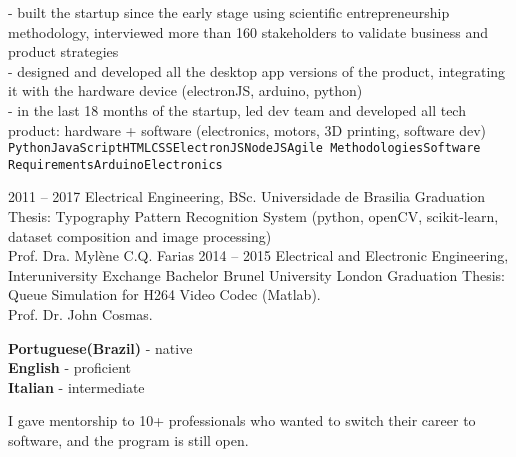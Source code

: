 \documentclass[9pt]{developercv} %
\begin{document}
\begin{entrylist}
{- built the startup since the early stage using scientific entrepreneurship methodology, interviewed more than 160 stakeholders to validate business and product strategies\\
- designed and developed all the desktop app versions of the product, integrating it with the hardware device (electronJS, arduino, python)\\
- in the last 18 months of the startup, led dev team and developed all tech product: hardware + software (electronics, motors, 3D printing, software dev)
\\\texttt{Python}\slashsep\texttt{JavaScript}\slashsep\texttt{HTML}\slashsep\texttt{CSS}\slashsep\texttt{ElectronJS}\slashsep\texttt{NodeJS}\slashsep\texttt{Agile Methodologies}\slashsep\texttt{Software Requirements}\slashsep\texttt{Arduino}\slashsep\texttt{Electronics}}
\end{entrylist}



\begin{entrylist}
	\entry
		{2011 -- 2017}
		{Electrical Engineering, BSc.}
		{Universidade de Brasilia}
		{Graduation Thesis: Typography Pattern Recognition System (python, openCV, scikit-learn, dataset composition and image processing)\\
Prof. Dra. Mylène C.Q. Farias}
	\entry
		{2014 -- 2015}
		{Electrical and Electronic Engineering, Interuniversity Exchange Bachelor}
		{Brunel University London}
		{Graduation Thesis: Queue Simulation for H264 Video Codec (Matlab).\\
Prof. Dr. John Cosmas.}
\end{entrylist}


\begin{minipage}[t]{0.5\textwidth}
	\vspace{-\baselineskip} %

	
	\textbf{Portuguese(Brazil)} - native\\
	\textbf{English} - proficient\\
	\textbf{Italian} - intermediate
\end{minipage}
\hfill
\begin{minipage}[t]{0.5\textwidth}
	\vspace{-\baselineskip} %
	
	
	I gave mentorship to 10+ professionals who wanted to switch their career to software, and the program is still open. 
\end{minipage}

\end{document}
